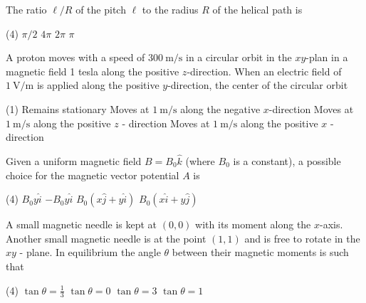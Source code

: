 \begin{enumerate}
\begin{minipage}{\textwidth}
	The ratio $\ell / R$ of the pitch $\ell$ to the radius $R$ of the helical path is
\end{minipage}
\begin{tasks}(4)
	\task[\textbf{A.}] $\pi / 2$
	\task[\textbf{B.}]$4 \pi$
	\task[\textbf{C.}]$2 \pi$
	\task[\textbf{D.}]$\pi$
\end{tasks}
\begin{minipage}{\textwidth}
	\item A proton moves with a speed of $300 \mathrm{~m} / \mathrm{s}$ in a circular orbit in the $x y$-plan in a magnetic field 1 tesla along the positive $z$-direction. When an electric field of $1 \mathrm{~V} / \mathrm{m}$ is applied along the positive $y$-direction, the center of the circular orbit
\end{minipage}
\begin{tasks}(1)
	\task[\textbf{A.}]Remains stationary
	\task[\textbf{B.}]Moves at $1 \mathrm{~m} / \mathrm{s}$ along the negative $x$-direction
	\task[\textbf{C.}]Moves at $1 \mathrm{~m} / \mathrm{s}$ along the positive $z$ - direction
	\task[\textbf{D.}]Moves at $1 \mathrm{~m} / \mathrm{s}$ along the positive $x$ - direction
\end{tasks}
\begin{minipage}{\textwidth}
	\item Given a uniform magnetic field $B=B_{0} \hat{k}$ (where $B_{0}$ is a constant), a possible choice for the magnetic vector potential $A$ is
\end{minipage}
\begin{tasks}(4)
	\task[\textbf{A.}] $B_{0} y \hat{i}$
	\task[\textbf{B.}] $-B_{0} y \hat{i}$
	\task[\textbf{C.}] $B_{0}(x \hat{j}+y \hat{i})$
	\task[\textbf{D.}]$B_{0}(x \hat{i}+y \hat{j})$
\end{tasks}
\begin{minipage}{\textwidth}
	\item A small magnetic needle is kept at $(0,0)$ with its moment along the $x$-axis. Another small magnetic needle is at the point $(1,1)$ and is free to rotate in the $x y$ - plane. In equilibrium the angle $\theta$ between their magnetic moments is such that
\end{minipage}
\begin{tasks}(4)
	\task[\textbf{A.}] $\tan \theta=\frac{1}{3}$
	\task[\textbf{B.}]$\tan \theta=0$
	\task[\textbf{C.}]$\tan \theta=3$
	\task[\textbf{D.}]$\tan \theta=1$
\end{tasks}
\begin{minipage}{\textwidth}

\end{minipage}
\end{enumerate}
